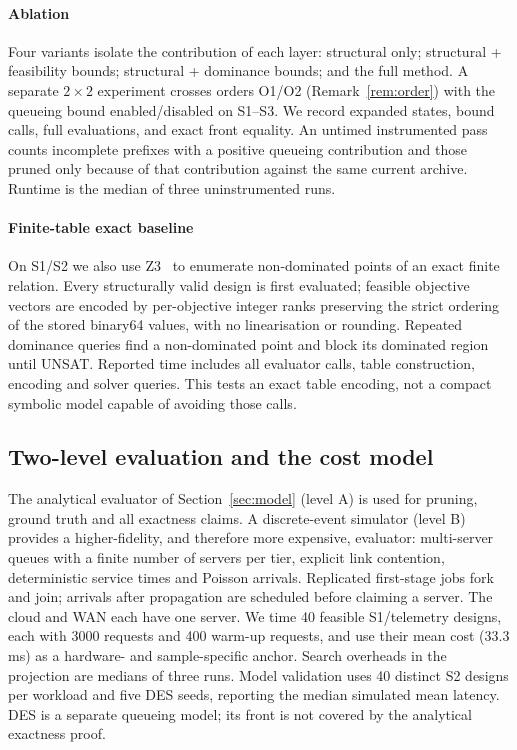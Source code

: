 \documentclass[preprint,11pt,3p]{elsarticle}
\theoremstyle{plain}
\theoremstyle{definition}
\newcommand{\DesCostMs}{33.3}
\begin{document}
\paragraph{Ablation}
Four variants isolate the contribution of each layer: structural only; structural +
feasibility bounds; structural + dominance bounds; and the full method. A separate
$2\times2$ experiment crosses orders O1/O2 (Remark~\ref{rem:order}) with the queueing
bound enabled/disabled on S1--S3. We record expanded states, bound calls, full evaluations,
and exact front equality. An untimed instrumented pass counts incomplete prefixes with a
positive queueing contribution and those pruned only because of that contribution against
the same current archive. Runtime is the median of three uninstrumented runs.

\paragraph{Finite-table exact baseline}
On S1/S2 we also use Z3~\cite{demoura2008z3} to enumerate non-dominated points of an exact
finite relation. Every structurally valid design is first evaluated; feasible objective
vectors are encoded by per-objective integer ranks preserving the strict ordering of the
stored binary64 values, with no linearisation or rounding. Repeated dominance queries
find a non-dominated point and block its dominated region until UNSAT. Reported time
includes all evaluator calls, table construction, encoding and solver queries. This tests
an exact table encoding, not a compact symbolic model capable of avoiding those calls.

\subsection{Two-level evaluation and the cost model}
The analytical evaluator of Section~\ref{sec:model} (level A) is used for pruning,
ground truth and all exactness claims. A discrete-event simulator (level B) provides a
higher-fidelity, and therefore more expensive, evaluator: multi-server queues with a
finite number of servers per tier, explicit link contention, deterministic service times
and Poisson arrivals. Replicated first-stage jobs fork and join; arrivals after propagation
are scheduled before claiming a server. The cloud and WAN each have one server. We time
40 feasible S1/telemetry designs, each with 3000 requests and 400 warm-up requests, and
use their mean cost (\DesCostMs\,ms) as a hardware- and sample-specific anchor. Search
overheads in the projection are medians of three runs. Model validation uses 40 distinct
S2 designs per workload and five DES seeds, reporting the median simulated mean latency.
DES is a separate queueing model; its front is not covered by the analytical exactness proof.
\end{document}
